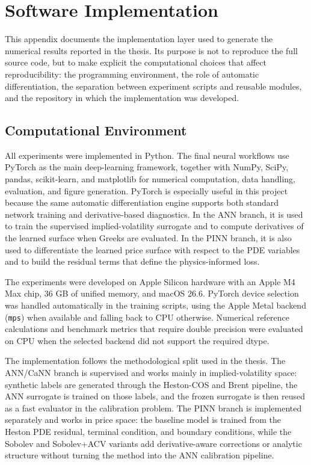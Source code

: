 \chapter{Software Implementation}
\label{app:software_implementation}

This appendix documents the implementation layer used to generate the numerical results reported in the thesis. Its purpose is not to reproduce the full source code, but to make explicit the computational choices that affect reproducibility: the programming environment, the role of automatic differentiation, the separation between experiment scripts and reusable modules, and the repository in which the implementation was developed.

\section{Computational Environment}

All experiments were implemented in Python. The final neural workflows use PyTorch as the main deep-learning framework, together with NumPy, SciPy, pandas, scikit-learn, and matplotlib for numerical computation, data handling, evaluation, and figure generation. PyTorch is especially useful in this project because the same automatic differentiation engine supports both standard network training and derivative-based diagnostics. In the ANN branch, it is used to train the supervised implied-volatility surrogate and to compute derivatives of the learned surface when Greeks are evaluated. In the PINN branch, it is also used to differentiate the learned price surface with respect to the PDE variables and to build the residual terms that define the physics-informed loss.

The experiments were developed on Apple Silicon hardware with an Apple M4 Max chip, 36 GB of unified memory, and macOS 26.6. PyTorch device selection was handled automatically in the training scripts, using the Apple Metal backend (\texttt{mps}) when available and falling back to CPU otherwise. Numerical reference calculations and benchmark metrics that require double precision were evaluated on CPU when the selected backend did not support the required dtype.

The implementation follows the methodological split used in the thesis. The ANN/CaNN branch is supervised and works mainly in implied-volatility space: synthetic labels are generated through the Heston-COS and Brent pipeline, the ANN surrogate is trained on those labels, and the frozen surrogate is then reused as a fast evaluator in the calibration problem. The PINN branch is implemented separately and works in price space: the baseline model is trained from the Heston PDE residual, terminal condition, and boundary conditions, while the Sobolev and Sobolev+ACV variants add derivative-aware corrections or analytic structure without turning the method into the ANN calibration pipeline.

